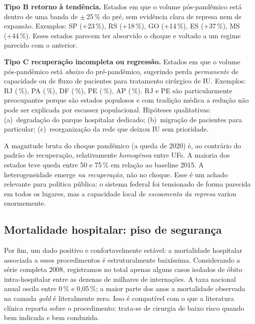 \documentclass[12pt,a4paper,oneside]{article}
\begin{document}
\textbf{Tipo B \textemdash{} retorno à tendência.} Estados em
que o volume pós-pandêmico está dentro de uma banda de
$\pm$\,25\,\% do pré, sem evidência clara de represa nem de
expansão. Exemplos: SP (+23\,\%), RS (+18\,\%), GO (+14\,\%),
ES (+37\,\%), MS (+44\,\%). Esses estados parecem ter
absorvido o choque e voltado a um regime parecido com o anterior.

\textbf{Tipo C \textemdash{} recuperação incompleta ou regressão.}
Estados em que o volume pós-pandêmico está \textit{abaixo} do
pré-pandêmico, sugerindo perda \textit{permanente} de
capacidade ou de fluxo de pacientes para tratamento cirúrgico
de IU. Exemplos: RJ (\,\%), PA (\,\%),
DF (\,\%), PE (\,\%), AP
(\,\%). RJ e PE são particularmente preocupantes
porque são estados populosos e com tradição médica
\textemdash{} a redução não pode ser explicada por escassez
populacional. Hipóteses qualitativas: (a)~degradação do parque
hospitalar dedicado; (b)~migração de pacientes para particular;
(c)~reorganização da rede que deixou IU sem prioridade.

A magnitude bruta do choque pandêmico (a queda de
2020) é, ao contrário do padrão de recuperação,
relativamente \textit{homogênea} entre UFs. A maioria dos
estados teve queda entre 50 e 75\,\% em relação ao baseline
2015. A heterogeneidade emerge \textit{na
recuperação}, não no choque. Esse é um achado relevante para
política pública: o sistema federal foi tensionado de forma
parecida em todos os lugares, mas a capacidade local de
\textit{escoamento da represa} variou enormemente.

\subsection{Mortalidade hospitalar: piso de segurança}\label{sub:mort}

Por fim, um dado positivo e confortavelmente estável: a
mortalidade hospitalar associada a esses procedimentos é
estruturalmente baixíssima. Considerando a série completa
2008, registramos no total apenas alguns casos
isolados de óbito intra-hospitalar entre as dezenas de milhares
de internações. A taxa nacional anual oscila entre 0\,\% e
0{,}05\,\%; a maior parte dos anos a mortalidade observada na
camada \textit{gold} é literalmente zero. Isso é compatível com
o que a literatura clínica reporta sobre o procedimento: trata-se
de cirurgia de baixo risco quando bem indicada e bem conduzida.
\end{document}

